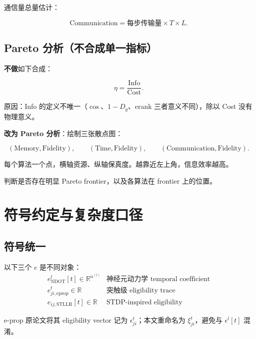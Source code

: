 \documentclass[journal,12pt,onecolumn]{IEEEtran}
\begin{document}
通信量总量估计：

\begin{equation}
\text{Communication}=\text{每步传输量}\times T\times L.
\end{equation}

\subsection{Pareto 分析（不合成单一指标）}

\textbf{不做}如下合成：

\begin{equation}
\eta=\frac{\text{Info}}{\text{Cost}}.
\end{equation}

原因：Info 的定义不唯一（$\cos$、$1-D_g$、erank 三者意义不同），除以 Cost 没有物理意义。

\textbf{改为 Pareto 分析}：绘制三张散点图：

\begin{equation}
(\text{Memory},\text{Fidelity}),
\qquad
(\text{Time},\text{Fidelity}),
\qquad
(\text{Communication},\text{Fidelity}).
\end{equation}

每个算法一个点，横轴资源、纵轴保真度。越靠近左上角，信息效率越高。

判断是否存在明显 Pareto frontier，以及各算法在 frontier 上的位置。

\section{符号约定与复杂度口径}

\subsection{符号统一}

以下三个 $e$ 是不同对象：
\begin{equation}
\begin{array}{cl}
e^{l}_{\mathrm{NDOT}}[t]\in\mathbb R^{n^{(l)}} & \text{神经元动力学 temporal coefficient}\\[1mm]
e^{t}_{ji,\mathrm{eprop}}\in\mathbb R & \text{突触级 eligibility trace}\\[1mm]
e_{ij,\mathrm{STLLR}}[t]\in\mathbb R & \text{STDP-inspired eligibility}
\end{array}
\end{equation}

e-prop 原论文将其 eligibility vector 记为 $\epsilon_{ji}^t$；本文重命名为 $\xi_{ji}^t$，避免与 $\epsilon^l[t]$ 混淆。
\end{document}
